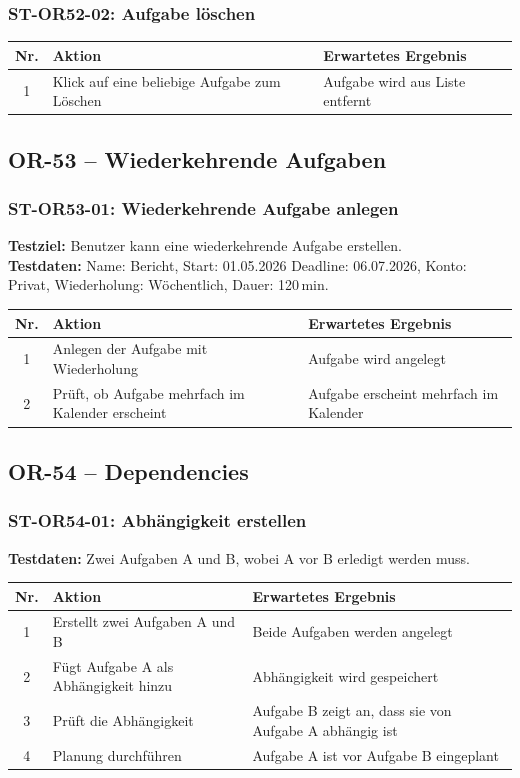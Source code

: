 \documentclass[a4paper,11pt]{article}
\begin{document}
\subsubsection*{ST-OR52-02: Aufgabe löschen}
\begin{longtable}{cp{5.5cm}p{5.5cm}}
    \toprule
    \textbf{Nr.} & \textbf{Aktion} & \textbf{Erwartetes Ergebnis} \\
    \midrule
    1 & Klick auf eine beliebige Aufgabe zum Löschen & Aufgabe wird aus Liste entfernt \\
    \bottomrule
\end{longtable}

\subsection{OR-53 -- Wiederkehrende Aufgaben}

\subsubsection*{ST-OR53-01: Wiederkehrende Aufgabe anlegen}
\textbf{Testziel:} Benutzer kann eine wiederkehrende Aufgabe erstellen. \\
\textbf{Testdaten:} Name: Bericht, Start: 01.05.2026 Deadline: 06.07.2026, Konto: Privat, Wiederholung: Wöchentlich, Dauer: 120\,min.

\begin{longtable}{cp{5.5cm}p{5.5cm}}
    \toprule
    \textbf{Nr.} & \textbf{Aktion} & \textbf{Erwartetes Ergebnis} \\
    \midrule
    1 & Anlegen der Aufgabe mit Wiederholung & Aufgabe wird angelegt \\
    2 & Prüft, ob Aufgabe mehrfach im Kalender erscheint & Aufgabe erscheint mehrfach im Kalender \\
    \bottomrule
\end{longtable}

\subsection{OR-54 -- Dependencies}

\subsubsection*{ST-OR54-01: Abhängigkeit erstellen}
\textbf{Testdaten:} Zwei Aufgaben A und B, wobei A vor B erledigt werden muss.

\begin{longtable}{cp{5.5cm}p{5.5cm}}
    \toprule
    \textbf{Nr.} & \textbf{Aktion} & \textbf{Erwartetes Ergebnis} \\
    \midrule
    1 & Erstellt zwei Aufgaben A und B & Beide Aufgaben werden angelegt \\
    2 & Fügt Aufgabe A als Abhängigkeit hinzu & Abhängigkeit wird gespeichert \\
    3 & Prüft die Abhängigkeit & Aufgabe B zeigt an, dass sie von Aufgabe A abhängig ist \\
    4 & Planung durchführen & Aufgabe A ist vor Aufgabe B eingeplant \\
    \bottomrule
\end{longtable}
\end{document}
